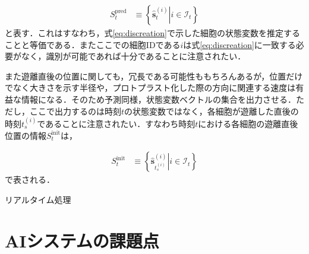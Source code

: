 \begin{equation}
    \begin{aligned}
        S^{\text{pred}}_t &\equiv \left\{ \left. \hat{\bm{s}}_t^{(i)}\right| i \in \mathcal{I}_t\right\}
    \end{aligned}
\end{equation}
と表す．これはすなわち，式\ref{eq:discreation}で示した細胞の状態変数を推定することと等価である．またここでの細胞IDである$i$は式\ref{eq:discreation}に一致する必要がなく，識別が可能であれば十分であることに注意されたい．
\par
また遊離直後の位置に関しても，冗長である可能性ももちろんあるが，位置だけでなく大きさを示す半径や，プロトプラスト化した際の方向に関連する速度は有益な情報になる．そのため予測同様，状態変数ベクトルの集合を出力させる．ただし，ここで出力するのは時刻$t$の状態変数ではなく，各細胞が遊離した直後の時刻$t_s^{(i)}$であることに注意されたい．すなわち時刻$t$における各細胞の遊離直後位置の情報$S^{\text{init}}_t$は，

\begin{equation}
    \begin{aligned}
        S^{\text{init}}_t &\equiv \left\{ \left. \hat{\bm{s}}_{t_s^{(i)}}^{(i)}\right| i \in \mathcal{I}_t\right\}
    \end{aligned}
\end{equation}
で表される．

\par
リアルタイム処理


\section{AIシステムの課題点}